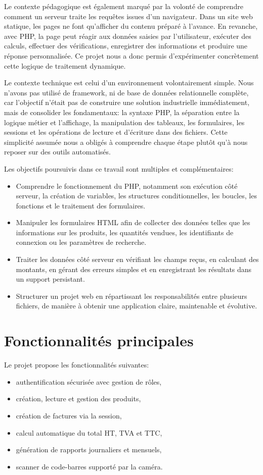\documentclass[12pt,a4paper]{article}
\begin{document}
Le contexte pédagogique est également marqué par la volonté de comprendre comment un serveur traite les requêtes issues d'un navigateur. Dans un site web statique, les pages ne font qu'afficher du contenu préparé à l'avance. En revanche, avec PHP, la page peut réagir aux données saisies par l'utilisateur, exécuter des calculs, effectuer des vérifications, enregistrer des informations et produire une réponse personnalisée. Ce projet nous a donc permis d'expérimenter concrètement cette logique de traitement dynamique.

Le contexte technique est celui d'un environnement volontairement simple. Nous n'avons pas utilisé de framework, ni de base de données relationnelle complète, car l'objectif n'était pas de construire une solution industrielle immédiatement, mais de consolider les fondamentaux: la syntaxe PHP, la séparation entre la logique métier et l'affichage, la manipulation des tableaux, les formulaires, les sessions et les opérations de lecture et d'écriture dans des fichiers. Cette simplicité assumée nous a obligés à comprendre chaque étape plutôt qu'à nous reposer sur des outils automatisés.

Les objectifs poursuivis dans ce travail sont multiples et complémentaires:
\begin{itemize}
\item Comprendre le fonctionnement du PHP, notamment son exécution côté serveur, la création de variables, les structures conditionnelles, les boucles, les fonctions et le traitement des formulaires.
\item Manipuler les formulaires HTML afin de collecter des données telles que les informations sur les produits, les quantités vendues, les identifiants de connexion ou les paramètres de recherche.
\item Traiter les données côté serveur en vérifiant les champs reçus, en calculant des montants, en gérant des erreurs simples et en enregistrant les résultats dans un support persistant.
\item Structurer un projet web en répartissant les responsabilités entre plusieurs fichiers, de manière à obtenir une application claire, maintenable et évolutive.
\end{itemize}


\section{Fonctionnalités principales}
Le projet propose les fonctionnalités suivantes:
\begin{itemize}
  \item authentification sécurisée avec gestion de rôles,
  \item création, lecture et gestion des produits,
  \item création de factures via la session,
  \item calcul automatique du total HT, TVA et TTC,
  \item génération de rapports journaliers et mensuels,
  \item scanner de code-barres supporté par la caméra.
\end{itemize}
\end{document}
